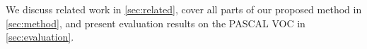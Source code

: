 


We discuss related work in \autoref{sec:related}, cover all parts of our proposed method in \autoref{sec:method}, and present evaluation results on the PASCAL VOC in \autoref{sec:evaluation}.
